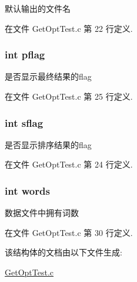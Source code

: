 默认输出的文件名 



在文件 Get\-Opt\-Test.\-c 第 22 行定义.

\hypertarget{structglobal_args__t_a3bf178baaa87d9153b6ef764640fe960}{
\subsubsection[{pflag}]{\setlength{\rightskip}{0pt plus 5cm}int pflag}}\label{structglobal_args__t_a3bf178baaa87d9153b6ef764640fe960}


是否显示最终结果的flag 



在文件 Get\-Opt\-Test.\-c 第 25 行定义.

\hypertarget{structglobal_args__t_acecd9ebff44a84e2d866ebc2e5e06da7}{
\subsubsection[{sflag}]{\setlength{\rightskip}{0pt plus 5cm}int sflag}}\label{structglobal_args__t_acecd9ebff44a84e2d866ebc2e5e06da7}


是否显示排序结果的flag 



在文件 Get\-Opt\-Test.\-c 第 24 行定义.

\hypertarget{structglobal_args__t_a76f30ccb790f9ab7ef115f30cf735cd5}{
\subsubsection[{words}]{\setlength{\rightskip}{0pt plus 5cm}int words}}\label{structglobal_args__t_a76f30ccb790f9ab7ef115f30cf735cd5}


数据文件中拥有词数 



在文件 Get\-Opt\-Test.\-c 第 30 行定义.



该结构体的文档由以下文件生成\-:\begin{DoxyCompactItemize}
\item 
\hyperlink{_get_opt_test_8c}{Get\-Opt\-Test.\-c}\end{DoxyCompactItemize}
